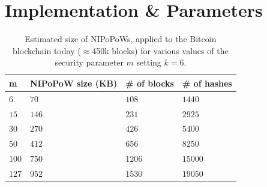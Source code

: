 \section{Implementation \& Parameters}

\begin{table}
  \caption{
    \label{table.size}
    Estimated size of NIPoPoWs, applied to the Bitcoin blockchain today ($\approx$450k blocks) for various values of the security parameter $m$
    setting $k = 6$.
  }
  \centering
  \begin{tabular}{l|l|l|l}
      {\bf m}  & {\bf NIPoPoW size (KB)} & {\bf \# of blocks} & {\bf
      \# of hashes}\\
      \hline
      $6$   & $70$  & $108$ & $1440$  \\
      $15$  & $146$ & $231$ & $2925$  \\
      $30$  & $270$ & $426$ & $5400$  \\
      $50$  & $412$ & $656$ & $8250$ \\
      $100$ & $750$ & $1206$ & $15000$ \\
      $127$ & $952$ & $1530$ & $19050$ \\
  \end{tabular}
\end{table}



